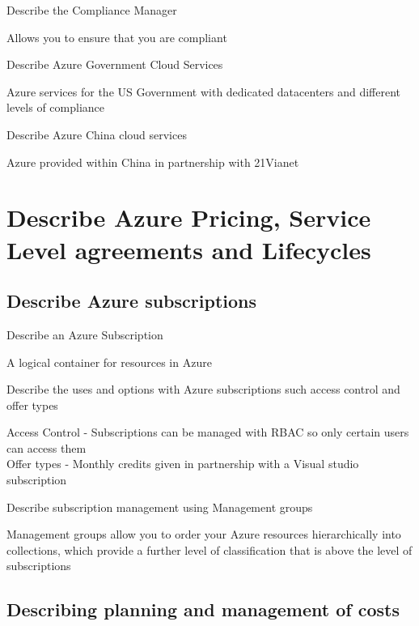 \documentclass[addpoints]{exam}
\begin{document}
\begin{questions}
\question Describe the Compliance Manager
\begin{solution}[2in]
	Allows you to ensure that you are compliant
\end{solution}

\question Describe Azure Government Cloud Services
\begin{solution}[2in]
	Azure services for the US Government with dedicated datacenters and different levels of compliance
\end{solution}

\question Describe Azure China cloud services
\begin{solution}[2in]
	Azure provided within China in partnership with 21Vianet
\end{solution}

\section{Describe Azure Pricing, Service Level agreements and Lifecycles}
\subsection{Describe Azure subscriptions}
\question Describe an Azure Subscription
\begin{solution}[2in]
	A logical container for resources in Azure
\end{solution}


\question Describe the uses and options with Azure subscriptions such access control and offer types
\begin{solution}[2in]
	Access Control - Subscriptions can be managed with RBAC so only certain users can access them \\
	Offer types - Monthly credits given in partnership with a Visual studio subscription
	
\end{solution}

\question Describe subscription management using Management groups
\begin{solution}[2in]
	Management groups allow you to order your Azure resources hierarchically into collections, which provide a further level of classification that is above the level of subscriptions
	
\end{solution}

\subsection{Describing planning and management of costs}


\end{questions}
\end{document}
